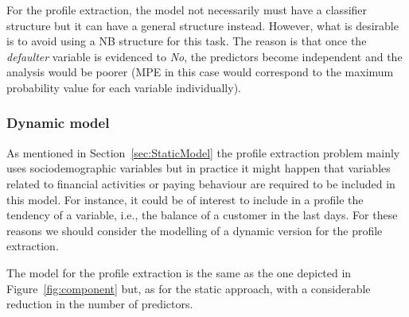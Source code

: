 
%

For the profile extraction, the model not necessarily must have a classifier structure but it can have a general structure instead. However, what is desirable is to avoid using a NB structure for this task. The reason is that once the \emph{defaulter} variable is evidenced to \emph{No}, the predictors become independent and the analysis would be poorer (MPE in this case would correspond to the maximum probability value for each variable individually).



\subsubsection*{Dynamic model}

As mentioned in Section~\ref{sec:StaticModel} the profile extraction problem mainly uses sociodemographic variables but in practice it might happen that variables related to financial activities or paying behaviour are required to be included in this model.  For instance, it could be of interest to include in a profile the tendency of a variable, i.e., the balance of a customer in the last days. For these reasons we should consider the modelling of a dynamic version for the profile extraction. 

The model for the profile extraction is the same as the one depicted in Figure~\ref{fig:component} but, as for the static approach, with a considerable reduction in the number of predictors. 

